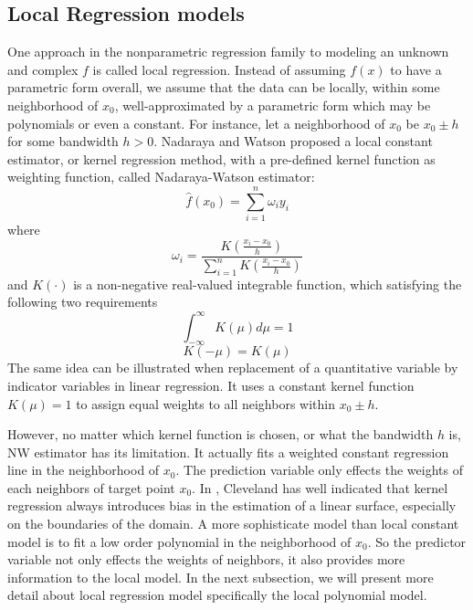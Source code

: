 \subsection{Local Regression models}

One approach in the nonparametric regression family to modeling an unknown and
complex $f$ is called local regression. Instead of assuming 
$f(x)$ to have a parametric form overall, we assume that the data can be locally, 
within some neighborhood of $x_0$, well-approximated by a parametric form which 
may be polynomials or even a constant. For instance, let a neighborhood of $x_0$ 
be $x_0 \pm h$ for some bandwidth $h > 0$.
Nadaraya \cite{nadaraya1964} and Watson \cite{watson1964} proposed a local 
constant estimator, or kernel regression method, with a pre-defined kernel 
function as weighting function, called Nadaraya-Watson estimator:
\begin{equation} 
\hat f(x_0) = \sum_{i=1}^{n} \omega_{i}y_i
\end{equation} 
where 
\begin{equation} 
\omega_i = \frac{ K(\frac{x_i - x_0}{h})}{\sum_{i=1}^n K(\frac{x_i - x_0}{h})}
\end{equation} 
and $K(\cdot)$ is a non-negative real-valued integrable function, which satisfying 
the following two requirements
\begin{equation} 
\int_{-\infty}^{\infty} K(\mu)d\mu = 1
\end{equation} 
\begin{equation} 
K(-\mu) = K(\mu)
\end{equation}
The same idea can be illustrated when replacement of a quantitative variable by
indicator variables in linear regression. It uses a constant kernel function 
$K(\mu) = 1$ to assign equal weights to all neighbors within $x_0 \pm h$. 

However, no matter which kernel function is chosen, or what the bandwidth $h$ is,
NW estimator has its limitation. It actually fits a weighted constant regression
line in the neighborhood of $x_0$. The prediction variable only effects the weights
of each neighbors of target point $x_0$. In \cite{cleveland1988regression}, 
Cleveland has well indicated that kernel regression always introduces bias in the
estimation of a linear surface, especially on the boundaries of the domain. A more 
sophisticate model than local constant model is to fit a low order polynomial in 
the neighborhood of $x_0$. So the 
predictor variable not only effects the weights of neighbors, it also provides more
information to the local model. In the next subsection, we will present more detail
about local regression model specifically the local polynomial model.

